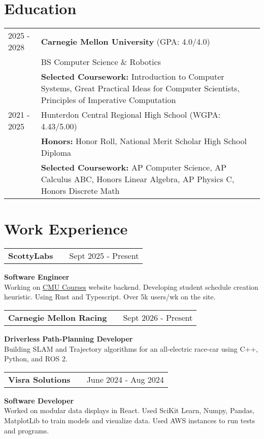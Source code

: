 \documentclass[a4paper,12pt]{article}
\makeatletter
\newenvironment{jobshort}[3]
    {
    \begin{tabularx}{\linewidth}{@{}l X r@{}}
    \textbf{#1} & \hfill &  #2 \\[3.5pt]
    \end{tabularx}
    #3 \\
    }
    {
    }
\makeatother
\begin{document}
\section{Education}
\begin{tabularx}{\linewidth}{@{}l X@{}}	
2025 - 2028 & \textbf{Carnegie Mellon University} \hfill (GPA: 4.0/4.0) \\ 
& \hfill BS Computer Science \& Robotics \\
& \textbf{Selected Coursework:} Introduction to Computer Systems, Great Practical Ideas for Computer Scientists, Principles of Imperative Computation \\

2021 - 2025 & Hunterdon Central Regional High School \hfill  (WGPA: 4.43/5.00) \\
&\textbf{Honors:} Honor Roll, National Merit Scholar \hfill High School Diploma \\
&\textbf{Selected Coursework:} AP Computer Science, AP Calculus ABC, Honors Linear Algebra, AP Physics C, Honors Discrete Math
\end{tabularx}

\section{Work Experience}

\begin{jobshort}{ScottyLabs}{Sept 2025 - Present}{\textbf{Software Engineer}}
Working on \href{https://cmucourses.com}{CMU Courses} website backend. Developing student schedule creation heuristic. Using Rust and Typescript. Over 5k users/wk on the site.
\end{jobshort}

\begin{jobshort}{Carnegie Mellon Racing}{Sept 2026 - Present}{\textbf{Driverless Path-Planning Developer}}
Building SLAM and Trajectory algorithms for an all-electric race-car using C++, Python, and ROS 2.
\end{jobshort}

\begin{jobshort}{Visra Solutions}{June 2024 - Aug 2024}{\textbf{Software Developer}}
Worked on modular data displays in React. Used SciKit Learn, Numpy, Pandas, MatplotLib to train models and visualize data. Used AWS instances to run tests and programs.
\end{jobshort}
\end{document}
